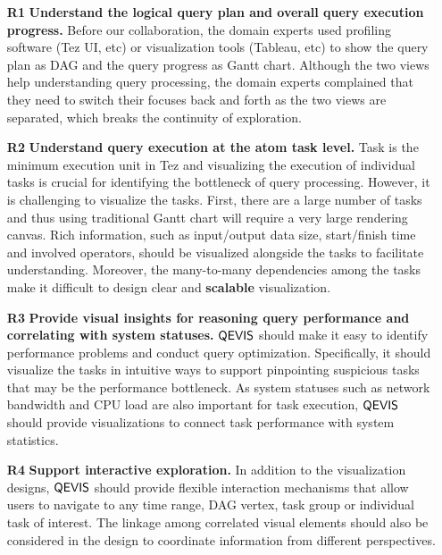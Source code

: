 \begin{itemize}
	\item[\textbf{R1}]\textbf{Understand the logical query plan and overall query execution progress.} Before our collaboration, the domain experts used profiling software (Tez  UI, etc) or visualization tools (Tableau, etc) to show the query plan as DAG and the query progress as Gantt chart. Although the two views help understanding query processing, the domain experts complained that they need to switch their focuses back and forth as the two views are separated, which breaks the continuity of exploration.
	
	\item[\textbf{R2}]\textbf{Understand query execution at the atom task level.} Task is the minimum execution unit in Tez and visualizing the execution of individual tasks is crucial for identifying the bottleneck of query processing. However, it is challenging to visualize the tasks. First, there are a large number of tasks and thus using traditional Gantt chart will require a very large rendering canvas. Rich information, such as input/output data size, start/finish time and involved operators, should be visualized alongside the tasks to facilitate understanding. Moreover, the many-to-many dependencies among the tasks make it difficult to design clear and \textbf{scalable} visualization.
	
	\item[\textbf{R3}]\textbf{Provide visual insights for reasoning query performance and correlating with system statuses.} $\mathsf{QEVIS}$ should make it easy to identify performance problems and conduct query optimization. Specifically, it should visualize the tasks in intuitive ways to support pinpointing suspicious tasks that may be the performance bottleneck. As system statuses such as network bandwidth and CPU load are also important for task execution, $\mathsf{QEVIS}$ should provide visualizations to connect task performance with system statistics. 
	
	\item[\textbf{R4}]\textbf{Support interactive exploration.} In addition to the visualization designs, $\mathsf{QEVIS}$ should provide flexible interaction mechanisms that allow users to navigate to any time range, DAG vertex, task group or individual task of interest. The linkage among correlated visual elements should also be considered in the design to coordinate information from different perspectives.
\end{itemize}


